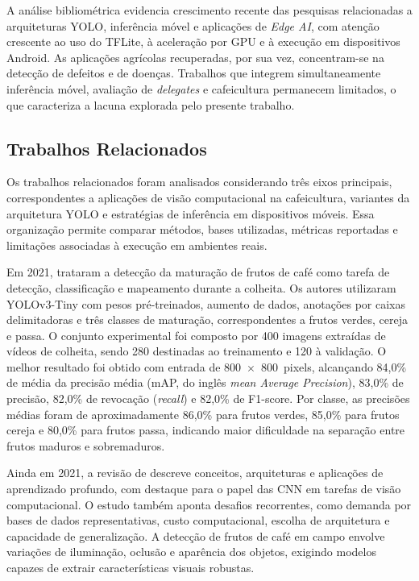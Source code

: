 \documentclass[artigo,times,capa]{iftex2024}
\begin{document}


A análise bibliométrica evidencia crescimento recente das pesquisas relacionadas a arquiteturas \ac{YOLO}, inferência móvel e aplicações de \textit{Edge AI}, com atenção crescente ao uso do \ac{TFLite}, à aceleração por \ac{GPU} e à execução em dispositivos Android. As aplicações agrícolas recuperadas, por sua vez, concentram-se na detecção de defeitos e de doenças. Trabalhos que integrem simultaneamente inferência móvel, avaliação de \textit{delegates} e cafeicultura permanecem limitados, o que caracteriza a lacuna explorada pelo presente trabalho.
 
\subsection{Trabalhos Relacionados}

Os trabalhos relacionados foram analisados considerando três eixos principais, correspondentes a aplicações de visão computacional na cafeicultura, variantes da arquitetura \ac{YOLO} e estratégias de inferência em dispositivos móveis. Essa organização permite comparar métodos, bases utilizadas, métricas reportadas e limitações associadas à execução em ambientes reais.

Em 2021, \textcite{Bazame2021Detection} trataram a detecção da
maturação de frutos de café como tarefa de detecção, classificação e mapeamento
durante a colheita. Os autores utilizaram YOLOv3-Tiny com pesos pré-treinados, aumento de
dados, anotações por caixas delimitadoras e três classes de maturação,
correspondentes a frutos verdes, cereja e passa. O conjunto experimental foi composto por 400 imagens
extraídas de vídeos de colheita, sendo 280 destinadas ao treinamento e 120 à
validação. O melhor resultado foi obtido com entrada de 800~$\times$~800~pixels,
alcançando 84,0\% de média da precisão média (mAP, do inglês \textit{mean Average Precision}), 83,0\% de precisão, 82,0\% de revocação (\textit{recall}) e 82,0\% de
F1-score. Por classe, as precisões médias foram de aproximadamente 86,0\% para
frutos verdes, 85,0\% para frutos cereja e 80,0\% para frutos passa, indicando
maior dificuldade na separação entre frutos maduros e sobremaduros.

Ainda em 2021, a revisão de \textcite{Alzubaidi2021Review} descreve conceitos, arquiteturas e aplicações de aprendizado profundo, com destaque para o papel das \ac{CNN} em tarefas de visão computacional. O estudo também aponta desafios recorrentes, como demanda por bases de dados representativas, custo computacional, escolha de arquitetura e capacidade de generalização. A detecção de frutos de café em campo envolve variações de iluminação, oclusão e aparência dos objetos, exigindo modelos capazes de extrair características visuais robustas.
\end{document}
